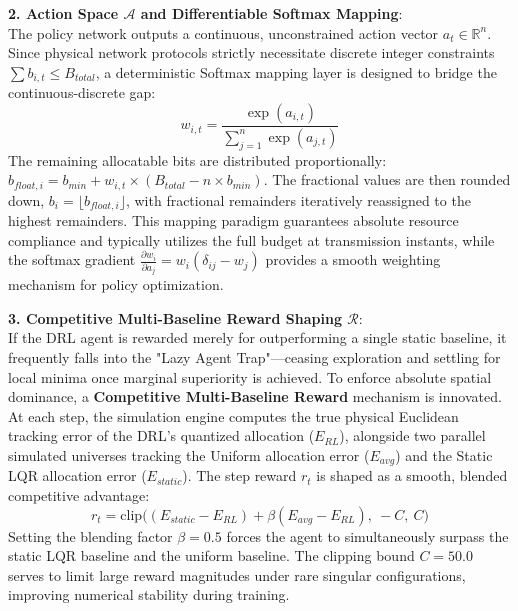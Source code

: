 \vspace{0.5em}
\noindent\textbf{2. Action Space $\mathcal{A}$ and Differentiable Softmax Mapping}:\\
The policy network outputs a continuous, unconstrained action vector $a_t \in \mathbb{R}^n$. Since physical network protocols strictly necessitate discrete integer constraints $\sum b_{i,t} \le B_{total}$, a deterministic Softmax mapping layer is designed to bridge the continuous-discrete gap:
\begin{equation}
    w_{i,t} = \frac{\exp(a_{i,t})}{\sum_{j=1}^n \exp(a_{j,t})}
\end{equation}
The remaining allocatable bits are distributed proportionally: $b_{float, i} = b_{min} + w_{i,t} \times (B_{total} - n \times b_{min})$. The fractional values are then rounded down, $b_i=\lfloor b_{float, i} \rfloor$, with fractional remainders iteratively reassigned to the highest remainders. This mapping paradigm guarantees absolute resource compliance and typically utilizes the full budget at transmission instants, while the softmax gradient $\frac{\partial w_i}{\partial a_j} = w_i (\delta_{ij} - w_j)$ provides a smooth weighting mechanism for policy optimization.

\vspace{0.5em}
\noindent\textbf{3. Competitive Multi-Baseline Reward Shaping $\mathcal{R}$}:\\
If the DRL agent is rewarded merely for outperforming a single static baseline, it frequently falls into the "Lazy Agent Trap"—ceasing exploration and settling for local minima once marginal superiority is achieved. To enforce absolute spatial dominance, a \textbf{Competitive Multi-Baseline Reward} mechanism is innovated.
At each step, the simulation engine computes the true physical Euclidean tracking error of the DRL's quantized allocation ($E_{RL}$), alongside two parallel simulated universes tracking the Uniform allocation error ($E_{avg}$) and the Static LQR allocation error ($E_{static}$). The step reward $r_t$ is shaped as a smooth, blended competitive advantage:
\begin{equation} \label{eq:reward_shaping}
    r_t = \text{clip}\Big( (E_{static} - E_{RL}) + \beta (E_{avg} - E_{RL}), \ -C, \ C \Big)
\end{equation}
Setting the blending factor $\beta = 0.5$ forces the agent to simultaneously surpass the static LQR baseline and the uniform baseline. The clipping bound $C = 50.0$ serves to limit large reward magnitudes under rare singular configurations, improving numerical stability during training.

